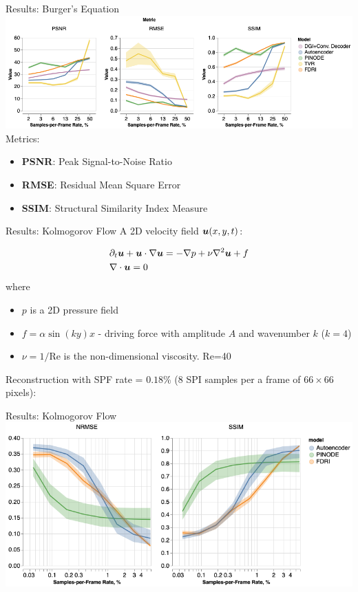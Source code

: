 \documentclass[8pt]{beamer}
\begin{document}
\begin{frame}{Results: Burger's Equation}
	\includegraphics[width=\textwidth]{Figures/cs_burgers_psnr.png}
	\vspace{2em}
	Metrics:
	\begin{itemize}
		\item \textbf{PSNR}: Peak Signal-to-Noise Ratio 
		\item \textbf{RMSE}: Residual Mean Square Error
		\item \textbf{SSIM}: Structural Similarity Index Measure
	\end{itemize}
\end{frame}

\begin{frame}[label=again]{Results: Kolmogorov Flow}
	A 2D velocity field $\boldsymbol{u}(x, y, t)$:

	\begin{align}
	\label{eq:kolmogorov_flow_definition}
	& \partial_t \boldsymbol{u} + \boldsymbol{u} \cdot \nabla \boldsymbol{u} = -\nabla p + \nu\nabla^2\boldsymbol{u} + f \\
	& \nabla \cdot \boldsymbol{u} = 0
	\end{align}
	where 
	\begin{itemize}
		\item $p$ is a 2D pressure field
		\item $f = \alpha\sin(ky)x$ - driving force with amplitude $A$ and wavenumber $k$ ($k=4$)
		\item $\nu = 1/\text{Re}$ is the non-dimensional viscosity. Re=40
	\end{itemize}
	\vspace{1em}
	Reconstruction with SPF rate = $0.18$\% (8 SPI samples per a frame of $66\times 66$ pixels):  
\end{frame}

\begin{frame}{Results: Kolmogorov Flow}
	\includegraphics[width=\textwidth]{Figures/cs_kolm_aggregate.png}
\end{frame}
\end{document}
